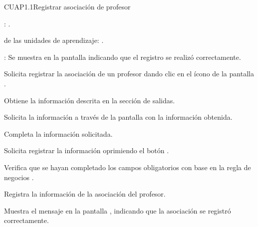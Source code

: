 \begin{UseCase}{CUAP1.1}{Registrar asociación de profesor}
{\begin{UClist}
			\UCli {}: \ioObtener.
			
			\UCli {} de las unidades de aprendizaje: \ioObtener.
			
			\UCli {}: Se muestra en la pantalla  indicando que el registro se realizó correctamente.
		\end{UClist}
	}
\end{UseCase}

\begin{UCtrayectoria}
	\UCpaso [\UCactor] Solicita registrar la asociación de un profesor dando clic en el ícono \btnRegistrar de la pantalla . 
	
	\UCpaso [\UCsist] Obtiene la información descrita en la sección de salidas.
	
	\UCpaso [\UCsist] Solicita la información a través de la pantalla  con la información obtenida.
	
	\UCpaso [\UCactor] Completa la información solicitada. \label{CUAP1.1:CompletaInfo}
	
	\UCpaso [\UCactor] Solicita registrar la información oprimiendo el botón . 
	
	\UCpaso [\UCsist] Verifica que se hayan completado los campos obligatorios con base en la regla de negocios . 
	
	\UCpaso [\UCsist] Registra la información de la asociación del profesor.
	
	\UCpaso [\UCsist] Muestra el mensaje  en la pantalla , indicando que la asociación  se registró correctamente.	
	
\end{UCtrayectoria}


